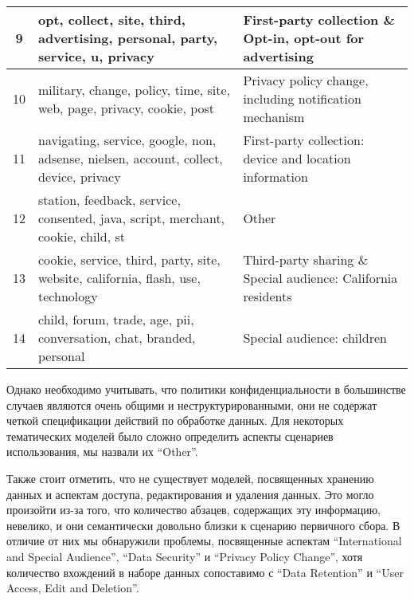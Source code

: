 \documentclass[../main]{subfiles}
\begin{document}
\begin{longtable}[H]{
    |c
    |>{\setstretch{1}}m{}
    |>{\setstretch{1}}m{}|}
    9 & opt, collect, site, third, advertising, personal, party, service, u, privacy & First-party collection \& Opt-in, opt-out for advertising \\\hline
    10 & military, change, policy, time, site, web, page, privacy, cookie, post & Privacy policy change, including notification mechanism \\\hline
    11 & navigating, service, google, non, adsense, nielsen, account, collect, device, privacy & First-party collection: device and location information \\\hline
    12 & station, feedback, service, consented, java, script, merchant, cookie, child, st & Other \\\hline
    13 & cookie, service, third, party, site, website, california, flash, use, technology & Third-party sharing \& Special audience: California residents \\\hline
    14 & child, forum, trade, age, pii, conversation, chat, branded, personal & Special audience: children \\\hline
\end{longtable}

Однако необходимо учитывать, что политики конфиденциальности в большинстве случаев являются очень общими и неструктурированными, они не содержат четкой спецификации действий по обработке данных. Для некоторых тематических моделей было сложно определить аспекты сценариев использования, мы назвали их “Other”.

Также стоит отметить, что не существует моделей, посвященных хранению данных и аспектам доступа, редактирования и удаления данных. Это могло произойти из-за того, что количество абзацев, содержащих эту информацию, невелико, и они семантически довольно близки к сценарию первичного сбора. В отличие от них мы обнаружили проблемы, посвященные аспектам “International and Special Audience”, “Data Security” и “Privacy Policy Change”, хотя количество вхождений в наборе данных сопоставимо с “Data Retention” и “User Access, Edit and Deletion”.
\end{document}
